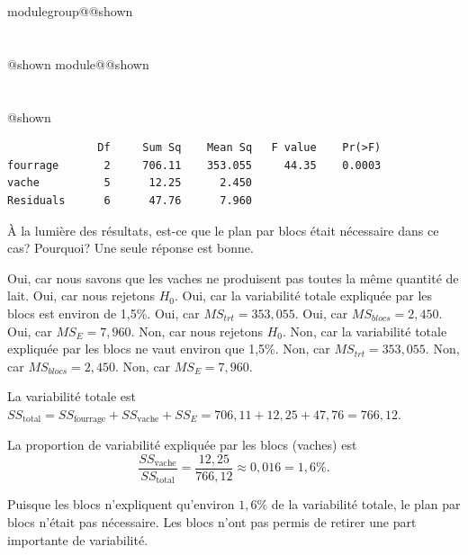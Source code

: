 \documentclass{Evaluation}
\makeatletter
\newcommand{\currentmodulekey}{}
\newcommand{\currentmoduletitle}{}
\newcommand{\currentgroupkey}{}
\newcommand{\currentgrouptitle}{}
\newcommand{\showmoduleifneeded}{%
  \ifx\currentgroupkey\empty\else
    \expandafter\ifx\csname modulegroup@\currentgroupkey @shown\endcsname\relax
      \section*{\currentgrouptitle}%
      \expandafter\gdef\csname modulegroup@\currentgroupkey @shown\endcsname{1}%
    \fi
  \fi
  \expandafter\ifx\csname module@\currentmodulekey @shown\endcsname\relax
    \section*{\currentmoduletitle}%
    \expandafter\gdef\csname module@\currentmodulekey @shown\endcsname{1}%
  \fi
}
\newenvironment{H24}{\showmoduleifneeded}{}
\makeatother
\begin{document}
\begin{questions}
\begin{H24}
\begin{verbatim}
              Df     Sum Sq    Mean Sq   F value    Pr(>F)   
fourrage       2     706.11    353.055     44.35    0.0003 
vache          5      12.25      2.450      
Residuals      6      47.76      7.960
\end{verbatim}

À la lumière des résultats, est-ce que le plan par blocs était nécessaire dans ce cas? Pourquoi? Une seule réponse est bonne.
\begin{checkboxes}
\choice Oui, car nous savons que les vaches ne produisent pas toutes la même quantité de lait.
\choice Oui, car nous rejetons $H_0$.
\choice Oui, car la variabilité totale expliquée par les blocs est environ de 1,5\%.
\choice Oui, car $MS_{trt}=353,055$.
\choice Oui, car $MS_{blocs}=2,450$.
\choice Oui, car $MS_{E}=7,960$.
\choice Non, car nous rejetons $H_0$.
\correctchoice Non, car la variabilité totale expliquée par les blocs ne vaut environ que 1,5\%.
\choice Non, car $MS_{trt}=353,055$.
\choice Non, car $MS_{blocs}=2,450$.
\choice Non, car $MS_{E}=7,960$.

\end{checkboxes}
\begin{solution}
La variabilité totale est $SS_{\text{total}} = SS_{\text{fourrage}} + SS_{\text{vache}} + SS_E = 706{,}11 + 12{,}25 + 47{,}76 = 766{,}12$.

La proportion de variabilité expliquée par les blocs (vaches) est
$$\frac{SS_{\text{vache}}}{SS_{\text{total}}} = \frac{12{,}25}{766{,}12} \approx 0{,}016 = 1{,}6\%.$$

Puisque les blocs n'expliquent qu'environ $1{,}6\%$ de la variabilité totale, le plan par blocs n'était pas nécessaire. Les blocs n'ont pas permis de retirer une part importante de variabilité.
\end{solution}
\end{H24}
\end{questions}
\end{document}
